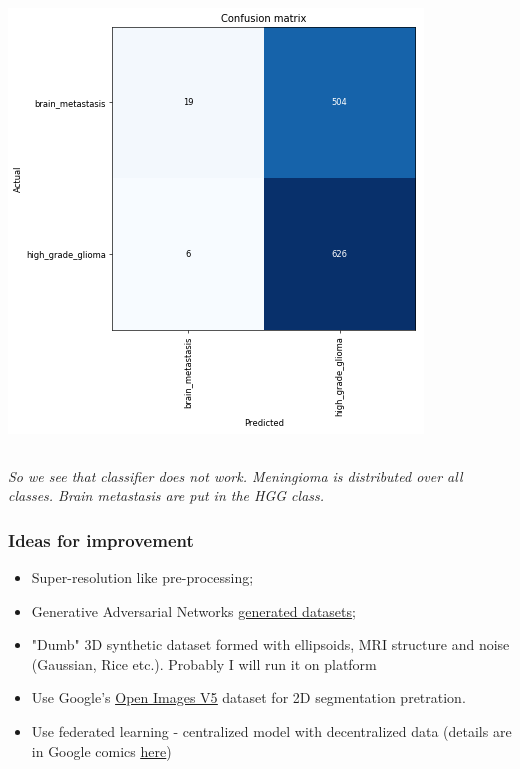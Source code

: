 \documentclass{beamer}
\begin{document}
\begin{frame}
\begin{columns}
\begin{column}{0.5\textwidth}
		\includegraphics[width=\textwidth]{images/confusion_2.png}
	\end{column}
\end{columns}
\textit{So we see that classifier does not work. Meningioma is distributed over all classes. Brain metastasis are put in the HGG class.}
\end{frame}


\begin{frame}
\frametitle{Ideas for improvement}
\begin{itemize}
	\item Super-resolution like pre-processing;
	\item Generative Adversarial Networks \href{https://news.developer.nvidia.com/ai-can-generate-synthetic-mris-to-advance-medical-research/}{{\color{blue}\underline{generated datasets}}};
	\item "Dumb" 3D synthetic dataset formed with ellipsoids, MRI structure and noise (Gaussian, Rice etc.). Probably I will run it on \href{https://colab.research.google.com/}{{}} platform
	\item Use  Google's \href{https://ai.googleblog.com/2019/05/announcing-open-images-v5-and-iccv-2019.html}{{\color{blue}\underline{Open Images V5}}} dataset for 2D segmentation pretration.
	\item Use federated learning - centralized model with decentralized data (details are in Google comics \href{https://federated.withgoogle.com/}{{\color{blue}\underline{here}}})
\end{itemize}
\end{frame}
\end{document}
